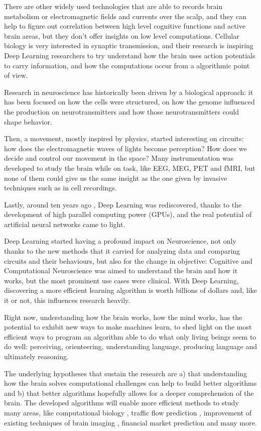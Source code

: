 There are other widely used technologies that are able to records brain metabolism or electromagnetic fields and currents over the scalp, and they can help to figure out correlation between high level cognitive functions and active brain areas, but they don't offer insights on low level computations. Cellular biology is very interested in synaptic transmission, and their research is inspiring Deep Learning researchers to try understand how the brain uses action potentials to carry information, and how the computations occur from a algorithmic point of view.

Research in neuroscience has historically been driven by a biological approach: it has been focused on how the cells were structured, on how the genome influenced the production on neurotransmitters and how those neurotransmitters could shape behavior. 

Then, a movement, mostly inspired by physics, started interesting on circuits: how does the electromagnetic waves of lights become perception? How does we decide and control our movement in the space? Many instrumentation was developed to study the brain while on task, like EEG, MEG, PET and fMRI, but none of them could give us the same insight as the one given by invasive techniques such as in cell recordings. 

Lastly, around ten years ago \cite{lecun2015deep}, Deep Learning was rediscovered, thanks to the development of high parallel computing power (GPUs), and the real potential of artificial neural networks came to light. 

Deep Learning started having a profound impact on Neuroscience, not only thanks to the new methods that it carried for analyzing data and comparing circuits and their behaviours, but also for the change in objective: Cognitive and Computational Neuroscience was aimed to understand the brain and how it works, but the most prominent use cases were clinical. With Deep Learning, discovering a more efficient learning algorithm is worth billions of dollars and, like it or not, this influences research heavily.

Right now, understanding how the brain works, how the mind works, has the potential to exhibit new ways to make machines learn, to shed light on the most efficient ways to program an algorithm able to do what only living beings seem to do well: perceiving, orienteering, understanding language, producing language and ultimately reasoning.

The underlying hypotheses that sustain the research are a) that understanding how the brain solves computational challenges can help to build better algorithms and b) that better algorithms hopefully allows for a deeper comprehension of the brain. The developed algorithms will enable more efficient methods to study many areas, like computational biology \cite{angermueller2016deep}, traffic flow prediction \cite{koesdwiady2016improving}, improvement of existing techniques of brain imaging \cite{milletari2017hough}, financial market prediction \cite{fischer2018deep} and many more.

